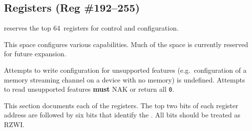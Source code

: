 \subsection{\proto Registers (Reg \#192--255)}
\label{cmd:mmap}
\begin{minipage}{\linewidth}
  \begin{varwidth}[b]{.55\linewidth}

\proto reserves the top 64~registers for control and configuration.

\medskip
This space configures various \proto capabilities. Much of the space is
currently reserved for future expansion.

\medskip
Attempts to write configuration for unsupported features (e.g.\ configuration
of a memory streaming channel on a device with no memory) is undefined.
Attempts to read unsupported features {\bf must} NAK or return all {\tt 0}.

\medskip
This section documents each of the registers. The top two bits of each \proto
register address are  followed by six bits that
identify the . All  bits
should be treated as RZWI.


\end{varwidth}
\end{minipage}
